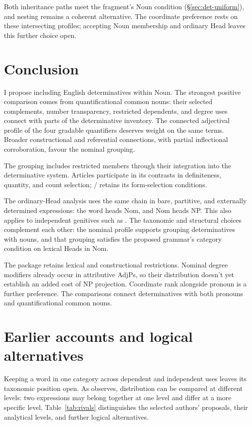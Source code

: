 \documentclass[12pt]{article}
\begin{document}
Both inheritance paths meet the fragment's Noun condition (§\ref{sec:det-uniform}), and nesting remains a coherent alternative. The coordinate preference rests on these intersecting profiles; accepting Noun membership and ordinary Head leaves this further choice open.

\section{Conclusion}\label{sec:conclusion}

I propose including English determinatives within Noun. The strongest positive comparison comes from quantificational common nouns: their selected complements, number transparency, restricted dependents, and degree uses connect with parts of the determinative inventory. The connected adjectival profile of the four gradable quantifiers deserves weight on the same terms. Broader constructional and referential connections, with partial inflectional corroboration, favour the nominal grouping.

The grouping includes restricted members through their integration into the determinative system. Articles participate in its contrasts in definiteness, quantity, and count selection; / retains its form-selection conditions.

The ordinary-Head analysis uses the same chain in bare, partitive, and externally determined expressions: the word heads Nom, and Nom heads NP. This also applies to independent genitives such as . The taxonomic and structural choices complement each other: the nominal profile supports grouping determinatives with nouns, and that grouping satisfies the proposed grammar's category condition on lexical Heads in Nom.

The package retains lexical and constructional restrictions. Nominal degree modifiers already occur in attributive AdjPs, so their distribution doesn't yet establish an added cost of NP projection. Coordinate rank alongside pronoun is a further preference. The comparisons connect determinatives with both pronouns and quantificational common nouns.

\appendix

\section{Earlier accounts and logical alternatives}\label{sec:historical}

Keeping a word in one category across dependent and independent uses leaves its taxonomic position open. As \textcite[232--235]{lyons1968} observes, distribution can be compared at different levels: two expressions may belong together at one level and differ at a more specific level. Table~\ref{tab:rivals} distinguishes the selected authors' proposals, their analytical levels, and further logical alternatives.
\end{document}
